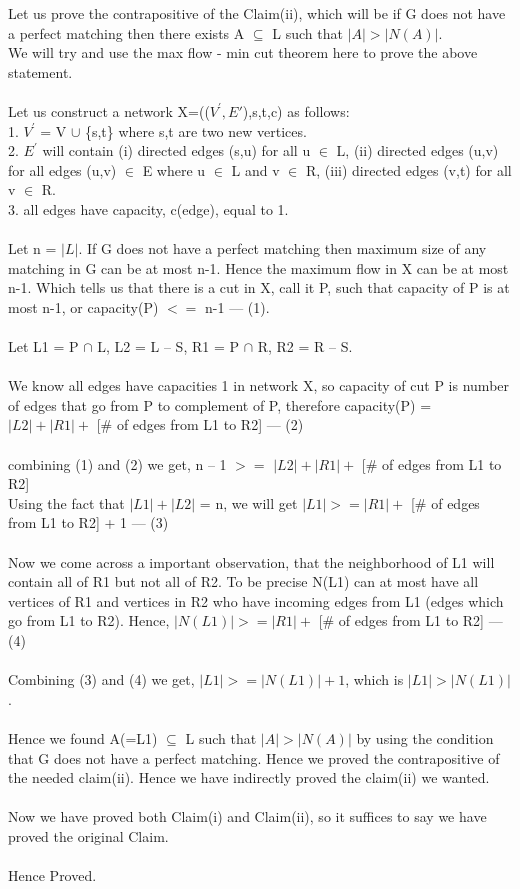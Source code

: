 \documentclass[a4 paper]{article}
\begin{document}
Let us prove the contrapositive of the Claim(ii), which will be if G does not have a perfect matching then there exists A $\subseteq$ L such that $|A|>|N(A)|$.\\ We will try and use the max flow - min cut theorem here to prove the above statement.\\\\
Let us construct a network X=(($V^{'},E{'}$),s,t,c) as follows:\\
1. $V^{'}$ = V $\cup$ \{s,t\} where s,t are two new vertices.\\
2. $E^{'}$ will contain (i) directed edges (s,u) for all u $\in$ L, (ii) directed edges (u,v) for all edges (u,v) $\in$ E where u $\in$ L and v $\in$ R, (iii) directed edges (v,t) for all v $\in$ R.\\
3. all edges have capacity, c(edge), equal to 1.\\\\
Let n = $|L|$. If G does not have a perfect matching then maximum size of any matching in G can be at most n-1. Hence the maximum flow in X can be at most n-1. Which tells us that there is a cut in X, call it P, such that capacity of P is at most n-1, or capacity(P) $<=$ n-1  --- (1).\\\\
Let L1 = P $\cap$ L, L2 = L -- S, R1 = P $\cap$ R, R2 = R -- S.\\\\
We know all edges have capacities 1 in network X, so capacity of cut P is number of edges that go from P to complement of P, therefore capacity(P) = $|L2| + |R1| +$ [\# of edges from L1 to R2]  --- (2)\\\\
combining (1) and (2) we get, n -- 1 $>=$ $|L2| + |R1| +$ [\# of edges from L1 to R2]\\
Using the fact that $|L1| + |L2|$ = n, we will get $|L1| >= |R1| +$ [\# of edges from L1 to R2] + 1  --- (3)\\\\
Now we come across a important observation, that the neighborhood of L1 will contain all of R1 but not all of R2. To be precise N(L1) can at most have all vertices of R1 and vertices in R2 who have incoming edges from L1 (edges which go from L1 to R2).
Hence, $|N(L1)| >= |R1| +$ [\# of edges from L1 to R2]  --- (4)\\\\
Combining (3) and (4) we get, $|L1| >= |N(L1)| + 1$, which is $|L1| > |N(L1)|$.\\\\
Hence we found A(=L1) $\subseteq$ L such that $|A|>|N(A)|$ by using the condition that G does not have a perfect matching. Hence we proved the contrapositive of the needed claim(ii). Hence we have indirectly proved the claim(ii) we wanted.\\\\
Now we have proved both Claim(i) and Claim(ii), so it suffices to say we have proved the original Claim.\\\\ Hence Proved.
\end{document}

